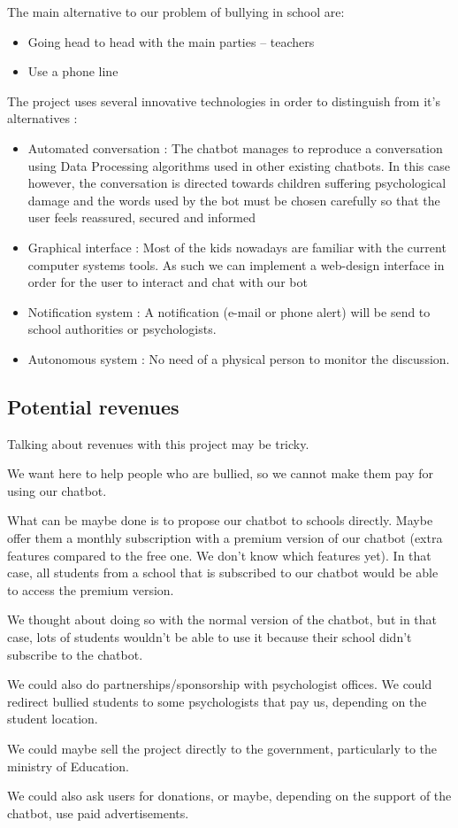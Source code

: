 \documentclass{article}
\begin{document}
The main alternative to our problem of bullying in school are:
\begin{itemize}
\item	Going head to head with the main parties – teachers
\item	Use a phone line
\end{itemize}
The project uses several innovative technologies in order to distinguish from it's alternatives :
\begin{itemize}
\item Automated conversation : The chatbot manages to reproduce a conversation using Data Processing algorithms used in other existing chatbots. In this case however, the conversation is directed towards children suffering psychological damage and the words used by the bot must be chosen carefully so that the user feels reassured, secured and informed
\item Graphical interface : Most of the kids nowadays are familiar with the current computer systems tools. As such we can implement a web-design interface in order for the user to interact and chat with our bot
\item Notification system : A notification (e-mail or phone alert) will be send to school authorities or psychologists. 
\item Autonomous system : No need of a physical person to monitor the discussion.
\end{itemize}

\subsection{Potential revenues}

Talking about revenues with this project may be tricky. 

We want here to help people who are bullied, so we cannot make them pay for using our chatbot.

What can be maybe done is to propose our chatbot to schools directly. Maybe offer them a monthly subscription with a premium version of our chatbot (extra features compared to the free one. We don’t know which features yet). In that case, all students from a school that is subscribed to our chatbot would be able to access the premium version.

We thought about doing so with the normal version of the chatbot, but in that case, lots of students wouldn't be able to use it because their school didn't subscribe to the chatbot.

We could also do partnerships/sponsorship with psychologist offices. We could redirect bullied students to some psychologists that pay us, depending on the student location.

We could maybe sell the project directly to the government, particularly to the ministry of Education.

We could also ask users for donations, or maybe, depending on the support of the chatbot, use paid advertisements.
\end{document}
